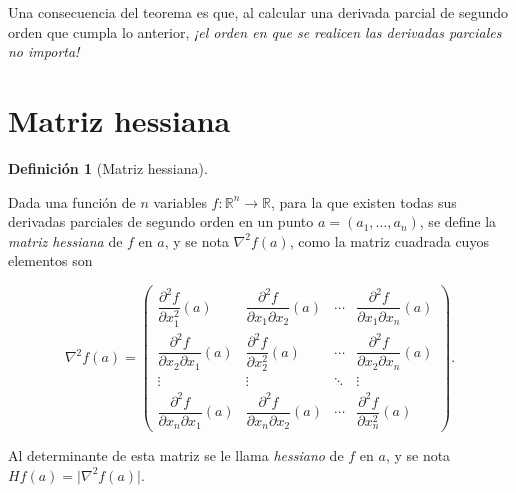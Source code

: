 \documentclass[
  a4paper,
]{scrreport}
\theoremstyle{plain}
\theoremstyle{definition}
\theoremstyle{plain}
\theoremstyle{plain}
\theoremstyle{definition}
\theoremstyle{definition}
\newtheorem{definition}{Definición}[chapter]
\theoremstyle{remark}
\begin{document}
Una consecuencia del teorema es que, al calcular una derivada parcial de
segundo orden que cumpla lo anterior, \emph{¡el orden en que se realicen
las derivadas parciales no importa!}

\section{Matriz hessiana}\label{matriz-hessiana}

\begin{definition}[Matriz
hessiana]\protect\hypertarget{def-matriz-hessiana}{}\label{def-matriz-hessiana}

Dada una función de \(n\) variables
\(f:\mathbb{R}^n\rightarrow \mathbb{R}\), para la que existen todas sus
derivadas parciales de segundo orden en un punto \(a=(a_1,\ldots,a_n)\),
se define la \emph{matriz hessiana} de \(f\) en \(a\), y se nota
\(\nabla^2f(a)\), como la matriz cuadrada cuyos elementos son

\[\nabla^2f(a)=\left(
\begin{array}{cccc}
\dfrac{\partial^2 f}{\partial x_1^2}(a) &
\dfrac{\partial^2 f}{\partial x_1 \partial x_2}(a) &
\cdots &
\dfrac{\partial^2 f}{\partial x_1 \partial x_n}(a)\\
\dfrac{\partial^2 f}{\partial x_2 \partial x_1}(a) &
\dfrac{\partial^2 f}{\partial x_2^2}(a) &
\cdots &
\dfrac{\partial^2 f}{\partial x_2 \partial x_n}(a)\\
\vdots & \vdots & \ddots & \vdots \\
\dfrac{\partial^2 f}{\partial x_n \partial x_1}(a) &
\dfrac{\partial^2 f}{\partial x_n \partial x_2}(a) &
\cdots &
\dfrac{\partial^2 f}{\partial x_n^2}(a)
\end{array}
\right).\]

Al determinante de esta matriz se le llama \emph{hessiano} de \(f\) en
\(a\), y se nota \(Hf(a)=\lvert \nabla^2f(a)\rvert\).

\end{definition}
\end{document}
